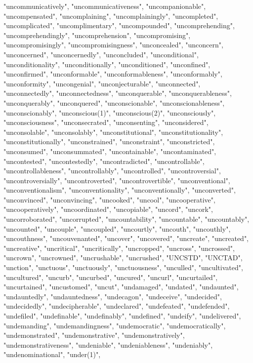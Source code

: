 "uncommunicatively",
"uncommunicativeness",
"uncompanionable",
"uncompensated",
"uncomplaining",
"uncomplainingly",
"uncompleted",
"uncomplicated",
"uncomplimentary",
"uncompounded",
"uncomprehending",
"uncomprehendingly",
"uncomprehension",
"uncompromising",
"uncompromisingly",
"uncompromisingness",
"unconcealed",
"unconcern",
"unconcerned",
"unconcernedly",
"unconcluded",
"unconditional",
"unconditionality",
"unconditionally",
"unconditioned",
"unconfined",
"unconfirmed",
"unconformable",
"unconformableness",
"unconformably",
"unconformity",
"uncongenial",
"unconjecturable",
"unconnected",
"unconnectedly",
"unconnectedness",
"unconquerable",
"unconquerableness",
"unconquerably",
"unconquered",
"unconscionable",
"unconscionableness",
"unconscionably",
"unconscious(1)",
"unconscious(2)",
"unconsciously",
"unconsciousness",
"unconsecrated",
"unconsenting",
"unconsidered",
"unconsolable",
"unconsolably",
"unconstitutional",
"unconstitutionality",
"unconstitutionally",
"unconstrained",
"unconstraint",
"unconstricted",
"unconsumed",
"unconsummated",
"uncontainable",
"uncontaminated",
"uncontested",
"uncontestedly",
"uncontradicted",
"uncontrollable",
"uncontrollableness",
"uncontrollably",
"uncontrolled",
"uncontroversial",
"uncontroversially",
"uncontroverted",
"uncontrovertible",
"unconventional",
"unconventionalism",
"unconventionality",
"unconventionally",
"unconverted",
"unconvinced",
"unconvincing",
"uncooked",
"uncool",
"uncooperative",
"uncooperatively",
"uncoordinated",
"uncopiable",
"uncord",
"uncork",
"uncorroborated",
"uncorrupted",
"uncountability",
"uncountable",
"uncountably",
"uncounted",
"uncouple",
"uncoupled",
"uncourtly",
"uncouth",
"uncouthly",
"uncouthness",
"uncouvenanted",
"uncover",
"uncovered",
"uncreate",
"uncreated",
"uncreative",
"uncritical",
"uncritically",
"uncropped",
"uncross",
"uncrossed",
"uncrown",
"uncrowned",
"uncrushable",
"uncrushed",
"UNCSTD",
"UNCTAD",
"unction",
"unctuous",
"unctuously",
"unctuousness",
"unculled",
"uncultivated",
"uncultured",
"uncurb",
"uncurbed",
"uncured",
"uncurl",
"uncurtailed",
"uncurtained",
"uncustomed",
"uncut",
"undamaged",
"undated",
"undaunted",
"undauntedly",
"undauntedness",
"undecagon",
"undeceive",
"undecided",
"undecidedly",
"undecipherable",
"undeclared",
"undefeated",
"undefended",
"undefiled",
"undefinable",
"undefinably",
"undefined",
"undeify",
"undelivered",
"undemanding",
"undemandingness",
"undemocratic",
"undemocratically",
"undemonstrated",
"undemonstrative",
"undemonstratively",
"undemonstrativeness",
"undeniable",
"undeniableness",
"undeniably",
"undenominational",
"under(1)",
